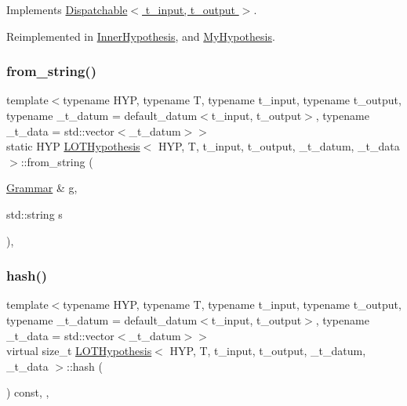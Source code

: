 Implements \hyperlink{class_dispatchable_a6d2bd844b0e55378d29ed85e718d0a77}{Dispatchable$<$ t\+\_\+input, t\+\_\+output $>$}.



Reimplemented in \hyperlink{class_inner_hypothesis_a73c38e91c7c1bf021cbc8f9e5a758d13}{Inner\+Hypothesis}, and \hyperlink{class_my_hypothesis_a3de47a545e8824bb8c63181965c62a01}{My\+Hypothesis}.

\mbox{\label{class_l_o_t_hypothesis_a684d3208f52e10c61418dc0707142a30}} 
\subsubsection{\texorpdfstring{from\+\_\+string()}{from\_string()}}
{\footnotesize\ttfamily template$<$typename H\+YP, typename T, typename t\+\_\+input, typename t\+\_\+output, typename \+\_\+t\+\_\+datum = default\+\_\+datum$<$t\+\_\+input, t\+\_\+output$>$, typename \+\_\+t\+\_\+data = std\+::vector$<$\+\_\+t\+\_\+datum$>$$>$ \\
static H\+YP \hyperlink{class_l_o_t_hypothesis}{L\+O\+T\+Hypothesis}$<$ H\+YP, T, t\+\_\+input, t\+\_\+output, \+\_\+t\+\_\+datum, \+\_\+t\+\_\+data $>$\+::from\+\_\+string (\begin{DoxyParamCaption}\item[{\hyperlink{class_grammar}{Grammar} \&}]{g,  }\item[{std\+::string}]{s }\end{DoxyParamCaption})\hspace{0.3cm}{\ttfamily [inline]}, {\ttfamily [static]}}

\mbox{\label{class_l_o_t_hypothesis_aa6859da0a3b422c32b1be2ffa025631a}} 
\subsubsection{\texorpdfstring{hash()}{hash()}}
{\footnotesize\ttfamily template$<$typename H\+YP, typename T, typename t\+\_\+input, typename t\+\_\+output, typename \+\_\+t\+\_\+datum = default\+\_\+datum$<$t\+\_\+input, t\+\_\+output$>$, typename \+\_\+t\+\_\+data = std\+::vector$<$\+\_\+t\+\_\+datum$>$$>$ \\
virtual size\+\_\+t \hyperlink{class_l_o_t_hypothesis}{L\+O\+T\+Hypothesis}$<$ H\+YP, T, t\+\_\+input, t\+\_\+output, \+\_\+t\+\_\+datum, \+\_\+t\+\_\+data $>$\+::hash (\begin{DoxyParamCaption}{ }\end{DoxyParamCaption}) const\hspace{0.3cm}{\ttfamily [inline]}, {\ttfamily [override]}, {\ttfamily [virtual]}}



